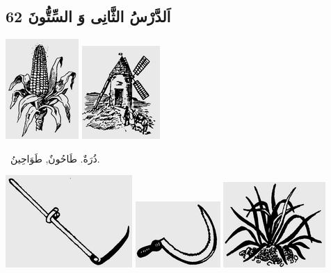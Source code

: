 \documentclass[a5paper]{article}
\begin{document}
\subsection[اَلدَّرْسُ الثَّانِى وَ السِّتُّونَ 62]{اَلدَّرْسُ الثَّانِى وَ السِّتُّونَ 62}
 \includegraphics[width=1.0937in,height=1.5in]{MuhammadBagauddinlatinized-img199.png}   \includegraphics[width=1.1665in,height=1.3957in]{MuhammadBagauddinlatinized-img200.png}  

\ ذُرَةٌ. طَاحُونٌ, طَوَاحِينُ. 

 \includegraphics[width=1.8957in,height=1.3854in]{MuhammadBagauddinlatinized-img201.png}   \includegraphics[width=1.2709in,height=0.9898in]{MuhammadBagauddinlatinized-img202.png}   \includegraphics[width=1.5311in,height=1.2811in]{MuhammadBagauddinlatinized-img203.png} 
\end{document}
